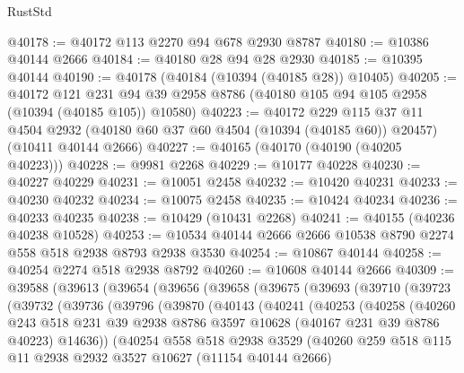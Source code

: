 \begin{lexlean}{RustStd}
\begin{coremodule}
@40178 := @40172 @113 @2270 @94 @678 @2930 @8787
@40180 := @10386 @40144 @2666
@40184 := @40180 @28 @94 @28 @2930
@40185 := @10395 @40144
@40190 := @40178 (@40184 (@10394 (@40185 @28)) @10405)
@40205 := @40172
    @121
    @231
    @94
    @39
    @2958
    @8786
    (@40180 @105 @94 @105 @2958 (@10394 (@40185 @105)) @10580)
@40223 := @40172
    @229
    @115
    @37
    @11
    @4504
    @2932
    (@40180 @60 @37 @60 @4504 (@10394 (@40185 @60)) @20457)
    (@10411 @40144 @2666)
@40227 := @40165 (@40170 (@40190 (@40205 @40223)))
@40228 := @9981 @2268
@40229 := @10177 @40228
@40230 := @40227 @40229
@40231 := @10051 @2458
@40232 := @10420 @40231
@40233 := @40230 @40232
@40234 := @10075 @2458
@40235 := @10424 @40234
@40236 := @40233 @40235
@40238 := @10429 (@10431 @2268)
@40241 := @40155 (@40236 @40238 @10528)
@40253 := @10534 @40144 @2666 @2666 @10538 @8790 @2274 @558 @518 @2938 @8793 @2938 @3530
@40254 := @10867 @40144
@40258 := @40254 @2274 @518 @2938 @8792
@40260 := @10608 @40144 @2666
@40309 := @39588
    (@39613
      (@39654
        (@39656
          (@39658
            (@39675
              (@39693
                (@39710
                  (@39723
                    (@39732
                      (@39736
                        (@39796
                          (@39870
                            (@40143
                              (@40241
                                (@40253
                                  (@40258
                                    (@40260
                                      @243
                                      @518
                                      @231
                                      @39
                                      @2938
                                      @8786
                                      @3597
                                      @10628
                                      (@40167 @231 @39 @8786 @40223)
                                      @14636))
                                  (@40254
                                    @558
                                    @518
                                    @2938
                                    @3529
                                    (@40260
                                      @259
                                      @518
                                      @115
                                      @11
                                      @2938
                                      @2932
                                      @3527
                                      @10627
                                      (@11154 @40144 @2666)

\end{coremodule}
\end{lexlean}
